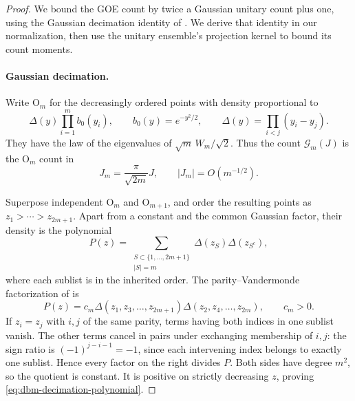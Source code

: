 \begin{proof}
We bound the GOE count by twice a Gaussian unitary count plus one, using
the Gaussian decimation identity of
\citet[arXiv version~2, Theorem~5.2 and Equation~(5.9)]{ForresterRains}.
We derive that identity in our normalization, then use the unitary
ensemble's projection kernel to bound its count moments.

\paragraph{Gaussian decimation.}
Write \(\mathrm O_m\) for the decreasingly ordered
points with density proportional to
\[
 \Delta(y)\prod_{i=1}^m b_0(y_i),\qquad
 b_0(y)=e^{-y^2/2},\qquad
 \Delta(y)=\prod_{i<j}(y_i-y_j).
\]
They have the law of the eigenvalues of \(\sqrt m\,W_m/\sqrt2\).
Thus the count \(\mathcal G_m(J)\) is the \(\mathrm O_m\) count in
\[
 J_m=\frac{\pi}{\sqrt{2m}}J,
 \qquad |J_m|=O(m^{-1/2}).
\]

Superpose independent \(\mathrm O_m\) and \(\mathrm O_{m+1}\),
and order the resulting points as
\(z_1>\cdots>z_{2m+1}\). Apart from a constant and the common Gaussian
factor, their density is the polynomial
\[
 P(z)=\sum_{\substack{S\subset\{1,\ldots,2m+1\}\\|S|=m}}
          \Delta(z_S)\Delta(z_{S^c}),
\]
where each sublist is in the inherited order. The parity--Vandermonde
factorization of \citet[arXiv version~2, Lemma~4.1 and Equation~(4.2)]{ForresterRains}
is
\begin{equation}
 \label{eq:dbm-decimation-polynomial}
 P(z)=c_m\Delta(z_1,z_3,\ldots,z_{2m+1})
             \Delta(z_2,z_4,\ldots,z_{2m}),\qquad c_m>0.
\end{equation}
If \(z_i=z_j\) with \(i,j\) of the same parity, terms having
both indices in one sublist vanish. The other terms cancel in pairs
under exchanging membership of \(i,j\): the sign ratio is
\((-1)^{j-i-1}=-1\), since each intervening index belongs to exactly
one sublist. Hence every factor on the right divides \(P\).
Both sides have degree \(m^2\), so the quotient is constant.
It is positive on strictly decreasing \(z\), proving
\eqref{eq:dbm-decimation-polynomial}.


\end{proof}
